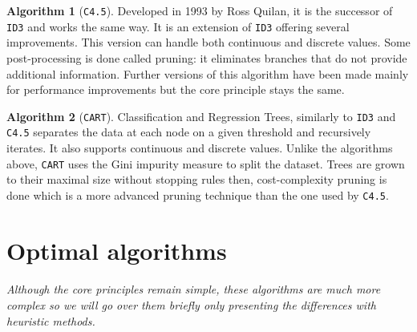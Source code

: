 \documentclass[12pt]{report}
\theoremstyle{definition}
\theoremstyle{definition}
\newtheorem*{algo}{Algorithm}
\theoremstyle{definition}
\begin{document}
\begin{algo}[\texttt{C4.5}]
    Developed in 1993 by Ross Quilan, it is the successor of \texttt{ID3} and works the same way. It is an extension
    of \texttt{ID3} offering several improvements. This version can handle both continuous and discrete values.
    Some post-processing is done called pruning: it eliminates branches that do not provide additional
    information. Further versions of this algorithm have been made mainly for performance improvements but
    the core principle stays the same.
\end{algo}

\begin{algo}[\texttt{CART}]
    Classification and Regression Trees, similarly to \texttt{ID3} and \texttt{C4.5} separates the data at each node
    on a given threshold and recursively iterates. It also supports continuous and discrete values. Unlike the algorithms
    above, \texttt{CART} uses the Gini impurity measure to split the dataset. Trees are grown to their maximal size
    without stopping rules then, cost-complexity pruning is done which is a more advanced pruning technique
    than the one used by \texttt{C4.5}.
\end{algo}


\section{Optimal algorithms}
\paragraph{} \textit{Although the core principles remain simple, these algorithms are much more complex so we will go
over them briefly only presenting the differences with heuristic methods.}
\end{document}

